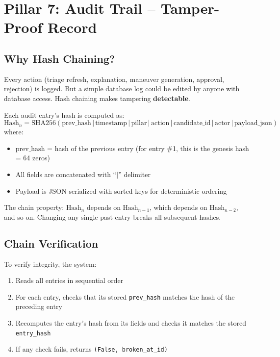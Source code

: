 \documentclass[12pt,a4paper]{article}
\begin{document}
\newpage
\section{Pillar 7: Audit Trail -- Tamper-Proof Record}

\subsection{Why Hash Chaining?}
Every action (triage refresh, explanation, maneuver generation, approval, rejection) is logged. But a simple database log could be edited by anyone with database access. Hash chaining makes tampering \textbf{detectable}.

\begin{formulabox}[title=Formula: SHA-256 Hash Chain]
Each audit entry's hash is computed as:
\[
\text{Hash}_n = \text{SHA256}\left(\text{prev\_hash} \,|\, \text{timestamp} \,|\, \text{pillar} \,|\, \text{action} \,|\, \text{candidate\_id} \,|\, \text{actor} \,|\, \text{payload\_json}\right)
\]
where:
\begin{itemize}
    \item $\text{prev\_hash}$ = hash of the previous entry (for entry \#1, this is the genesis hash = 64 zeros)
    \item All fields are concatenated with ``$|$'' delimiter
    \item Payload is JSON-serialized with sorted keys for deterministic ordering
\end{itemize}

The chain property: $\text{Hash}_n$ depends on $\text{Hash}_{n-1}$, which depends on $\text{Hash}_{n-2}$, and so on. Changing any single past entry breaks all subsequent hashes.
\end{formulabox}

\subsection{Chain Verification}
To verify integrity, the system:
\begin{enumerate}
    \item Reads all entries in sequential order
    \item For each entry, checks that its stored \texttt{prev\_hash} matches the hash of the preceding entry
    \item Recomputes the entry's hash from its fields and checks it matches the stored \texttt{entry\_hash}
    \item If any check fails, returns \texttt{(False, broken\_at\_id)}
\end{enumerate}
\end{document}
